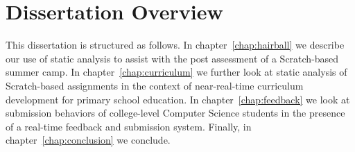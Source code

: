 \section{Dissertation Overview}
This dissertation is structured as follows. In chapter~\ref{chap:hairball} we
describe our use of static analysis to assist with the post assessment of a
Scratch-based summer camp. In chapter~\ref{chap:curriculum} we further look at
static analysis of Scratch-based assignments in the context of near-real-time
curriculum development for primary school education. In
chapter~\ref{chap:feedback} we look at submission behaviors of college-level
Computer Science students in the presence of a real-time feedback and
submission system. Finally, in chapter~\ref{chap:conclusion} we conclude.
